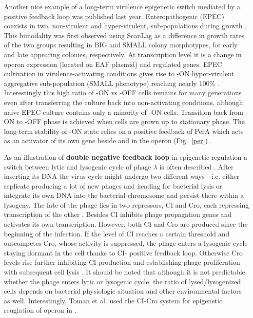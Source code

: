 Another nice example of a long-term virulence epigenetic switch mediated by a positive feedback loop was published last year.
Enteropathogenic  (EPEC) coexists in two, non-virulent and hyper-virulent, sub-populations during growth \cite{ronin2017long}.
This bimodality was first observed  using ScanLag \cite{levin2014scanlag} as a difference in growth rates of the two groups resulting in BIG and SMALL colony morphotypes, for early and late appearing colonies, respectively.
At transcription level it is a change in  operon expression (located on EAF plasmid) and  regulated genes.
EPEC cultivation in virulence-activating conditions gives rise to -ON hyper-virulent aggregative sub-population (SMALL phenotype) reaching nearly 100\% \cite{ronin2017long}.
Interestingly this high ratio of -ON vs -OFF cells remains for many generations even after transferring the culture back into non-activating conditions, although naive EPEC culture contains only a minority of -ON cells.
Transition back from -ON to -OFF phase is achieved when cells are grown up to stationary phase.
The long-term stability of -ON state relies on a positive feedback of PerA which acts as an activator of its own gene beside  and  in the  operon (Fig.~\ref{per}) \cite{ibarra2003identification, ronin2017long}.

As an illustration of \textbf{double negative feedback loop} in epigenetic regulation a switch between lytic and lysogenic cycle of  phage $\lambda$ is often described \cite{smits2006phenotypic, casadesus2013programmed}.
After inserting its DNA the virus cycle might undergo two different ways - i.e. either replicate producing a lot of new phages and heading for bacterial lysis or integrate its own DNA into the bacterial chromosome and persist there within a lysogeny.
The fate of the phage lies in two repressors, CI and Cro, each repressing transcription of the other \cite{eisen1970regulation, neubauer1970immunity}.
Besides CI inhibits phage propagation genes and activates its own transcription.
However, both CI and Cro are produced since the beginning of the infection.
If the level of CI reaches a certain threshold and outcompetes Cro, whose activity is suppressed, the phage enters a lysogenic cycle staying dormant in the cell thanks to CI- positive feedback loop.
Otherwise Cro levels rise further inhibiting CI production and establishing phage proliferation with subsequent cell lysis \cite{svenningsen2005role}.
It should be noted that although it is not predictable whether the phage enters lytic or lysogenic cycle, the ratio of lysed/lysogenized cells depends on bacterial physiologic situation and other environmental factors as well.
Interestingly, Toman et al. used the CI-Cro system for epigenetic reuglation of  operon in  \cite{toman1985system}.

